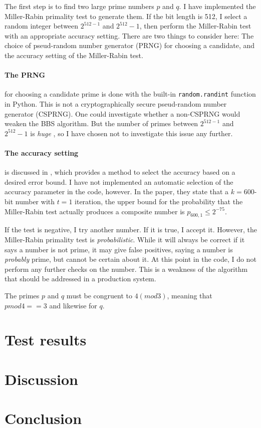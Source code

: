\documentclass[a4paper,english,12pt]{article}
\begin{document}
The first step is to find two large prime numbers $p$ and $q$. I have
implemented the Miller-Rabin \cite{miller.rabin} primality test to generate
them.
%
If the bit length is 512, I select a random integer between $2^{512-1}$ and
$2^{512}-1$, then perform the Miller-Rabin test with an appropriate accuracy
setting. There are two things to consider here: The choice of pseud-random
number generator (PRNG) for choosing a candidate, and the accuracy setting of
the Miller-Rabin test.

\paragraph{The PRNG} for choosing a candidate prime is done with the built-in
\texttt{random.randint} function in Python. This is not a cryptographically
secure pseud-random number generator (CSPRNG). One could investigate whether a
non-CSPRNG would weaken the BBS algorithm. But the number of primes between
$2^{512-1}$ and $2^{512}-1$ is \textit{huge} \cite{wiki:prime.counting}, so I
have chosen not to investigate this issue any further.

\paragraph{The accuracy setting} is discussed in \cite{damgaard1993average}, which
provides a method to select the accuracy based on a desired error bound. I have
not implemented an automatic selection of the accuracy parameter in the code,
however. In the paper, they state that a $k=600$-bit number with $t=1$
iteration, the upper bound for the probability that the Miller-Rabin test
actually produces a composite number is $p_{600, 1} \leqslant 2^{-75}$.

If the test is negative, I try another number. If it is true, I accept
it. However, the Miller-Rabin primality test is \textit{probabilistic}. While
it will always be correct if it says a number is not prime, it may give false
positives, saying a number is \textit{probably} prime, but cannot be certain
about it. At this point in the code, I do not perform any further checks on the
number. This is a weakness of the algorithm that should be addressed in a
production system.

The primes $p$ and $q$ must be congruent to $4 (mod 3)$, meaning that $p mod 4
== 3$ and likewise for $q$.

\section{Test results}

\section{Discussion}

\section{Conclusion}



\end{document}

